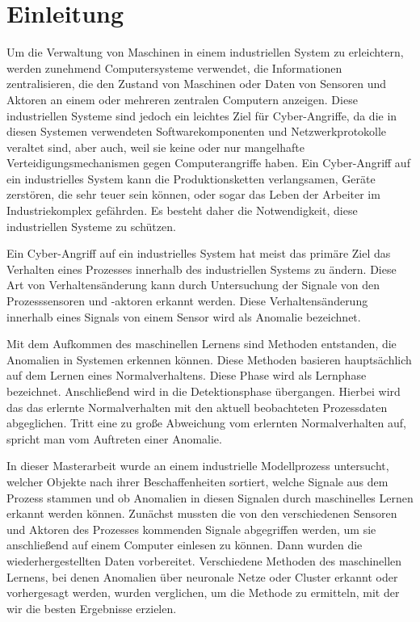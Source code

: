 \documentclass[12pt,a4paper]{scrartcl}
\numberwithin{equation}{section}
\begin{document}
 \newpage  %

  \pagestyle{headings}

\section{Einleitung}
Um die Verwaltung von Maschinen in einem industriellen System zu erleichtern, werden zunehmend Computersysteme verwendet, die Informationen zentralisieren, die den Zustand von Maschinen oder Daten von Sensoren und Aktoren an einem oder mehreren zentralen Computern anzeigen. Diese industriellen Systeme sind jedoch ein leichtes Ziel für Cyber-Angriffe, da die in diesen Systemen verwendeten Softwarekomponenten und Netzwerkprotokolle veraltet sind, aber auch, weil sie keine oder nur mangelhafte Verteidigungsmechanismen gegen Computerangriffe haben. Ein Cyber-Angriff auf ein industrielles System kann die Produktionsketten verlangsamen, Geräte zerstören, die sehr teuer sein können, oder sogar das Leben der Arbeiter im Industriekomplex gefährden. Es besteht daher die Notwendigkeit, diese industriellen Systeme zu schützen. 

Ein Cyber-Angriff auf ein industrielles System hat meist das primäre Ziel das Verhalten eines Prozesses innerhalb des industriellen Systems zu ändern. Diese Art von Verhaltensänderung kann durch Untersuchung der Signale von den Prozesssensoren und -aktoren erkannt werden. Diese Verhaltensänderung innerhalb eines Signals von einem Sensor wird als Anomalie bezeichnet. 

Mit dem Aufkommen des maschinellen Lernens sind Methoden entstanden, die Anomalien in Systemen erkennen können. Diese Methoden basieren hauptsächlich auf dem Lernen eines Normalverhaltens. Diese Phase wird als Lernphase bezeichnet. Anschließend wird in die Detektionsphase übergangen. Hierbei wird das das erlernte Normalverhalten mit den aktuell beobachteten Prozessdaten abgeglichen. Tritt eine zu große Abweichung vom erlernten Normalverhalten auf, spricht man vom Auftreten einer Anomalie. 

In dieser Masterarbeit wurde an einem industrielle Modellprozess untersucht, welcher Objekte nach ihrer Beschaffenheiten sortiert, welche Signale aus dem Prozess stammen und ob Anomalien in diesen Signalen durch maschinelles Lernen erkannt werden können. Zunächst mussten die von den verschiedenen Sensoren und Aktoren des Prozesses kommenden Signale abgegriffen werden, um sie anschließend auf einem Computer einlesen zu können. Dann wurden die wiederhergestellten Daten vorbereitet. Verschiedene Methoden des maschinellen Lernens, bei denen Anomalien über neuronale Netze oder Cluster erkannt oder vorhergesagt werden, wurden verglichen, um die Methode zu ermitteln, mit der wir die besten Ergebnisse erzielen. 
\end{document}
